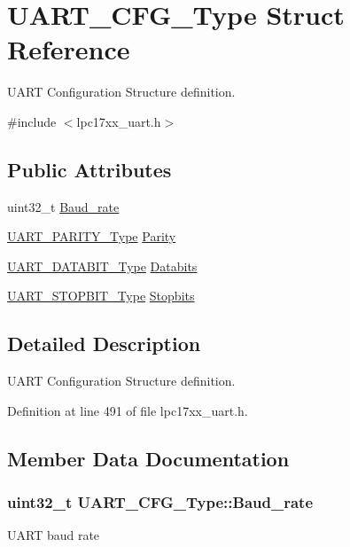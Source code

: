 \hypertarget{struct_u_a_r_t___c_f_g___type}{\section{\-U\-A\-R\-T\-\_\-\-C\-F\-G\-\_\-\-Type \-Struct \-Reference}
\label{struct_u_a_r_t___c_f_g___type}
}


\-U\-A\-R\-T \-Configuration \-Structure definition.  




{\ttfamily \#include $<$lpc17xx\-\_\-uart.\-h$>$}

\subsection*{\-Public \-Attributes}
\begin{DoxyCompactItemize}
\item 
uint32\-\_\-t \hyperlink{struct_u_a_r_t___c_f_g___type_a7065cb976e4b4d0affc0ee94113eebb2}{\-Baud\-\_\-rate}
\item 
\hyperlink{group___u_a_r_t___public___types_ga66fa9d836eb6f7035939427e6f8cc318}{\-U\-A\-R\-T\-\_\-\-P\-A\-R\-I\-T\-Y\-\_\-\-Type} \hyperlink{struct_u_a_r_t___c_f_g___type_aabca9f673560eb77a5c3136e766c55e4}{\-Parity}
\item 
\hyperlink{group___u_a_r_t___public___types_ga2b8c6f7ae8c1ff3557b3c9b67be69648}{\-U\-A\-R\-T\-\_\-\-D\-A\-T\-A\-B\-I\-T\-\_\-\-Type} \hyperlink{struct_u_a_r_t___c_f_g___type_a9186b2309198fd63e0ef9d078c265220}{\-Databits}
\item 
\hyperlink{group___u_a_r_t___public___types_gaa539c23e185a76d77b3c9efc3d62b68c}{\-U\-A\-R\-T\-\_\-\-S\-T\-O\-P\-B\-I\-T\-\_\-\-Type} \hyperlink{struct_u_a_r_t___c_f_g___type_afbf7b4f60c9d420b2bb41b58bb0212f6}{\-Stopbits}
\end{DoxyCompactItemize}


\subsection{\-Detailed \-Description}
\-U\-A\-R\-T \-Configuration \-Structure definition. 

\-Definition at line 491 of file lpc17xx\-\_\-uart.\-h.



\subsection{\-Member \-Data \-Documentation}
\hypertarget{struct_u_a_r_t___c_f_g___type_a7065cb976e4b4d0affc0ee94113eebb2}{
\subsubsection[{\-Baud\-\_\-rate}]{\setlength{\rightskip}{0pt plus 5cm}uint32\-\_\-t {\bf \-U\-A\-R\-T\-\_\-\-C\-F\-G\-\_\-\-Type\-::\-Baud\-\_\-rate}}}\label{struct_u_a_r_t___c_f_g___type_a7065cb976e4b4d0affc0ee94113eebb2}
\-U\-A\-R\-T baud rate 

